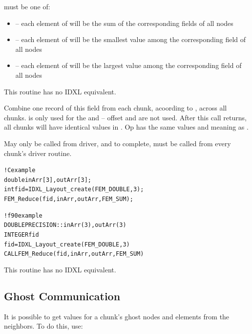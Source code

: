 \documentclass[10pt]{article}
\begin{document}
      must be one of:

\begin{itemize}
        \item {}-- each element of  will be the sum 
of the corresponding fields of all nodes
        \item {}-- each element of  will be the 
smallest value among the corresponding field of all nodes
        \item {}-- each element of  will be the largest 
value among the corresponding field of all nodes
\end{itemize}

     This routine has no IDXL equivalent.



     Combine one record of this field from each chunk, acoording to , 
 across all chunks.
 is only used for the  and -- offset and
 are not used.  After this call returns, all chunks will have
identical values in .  Op has the same values and meaning as
.

     May only be called from driver, and to complete, must be called
     from every chunk's driver routine.

\begin{alltt}
! C example
   double inArr[3], outArr[3];
   int fid=IDXL_Layout_create(FEM_DOUBLE,3);
   FEM_Reduce(fid,inArr,outArr,FEM_SUM);

! f90 example
   DOUBLE PRECISION :: inArr(3), outArr(3)
   INTEGER fid
   fid=IDXL_Layout_create(FEM_DOUBLE,3)
   CALL FEM_Reduce(fid,inArr,outArr,FEM_SUM)
\end{alltt}

     This routine has no IDXL equivalent.


\subsection{Ghost Communication}

It is possible to get values for a chunk's ghost nodes and elements from the neighbors. To do this, use:
\end{document}
